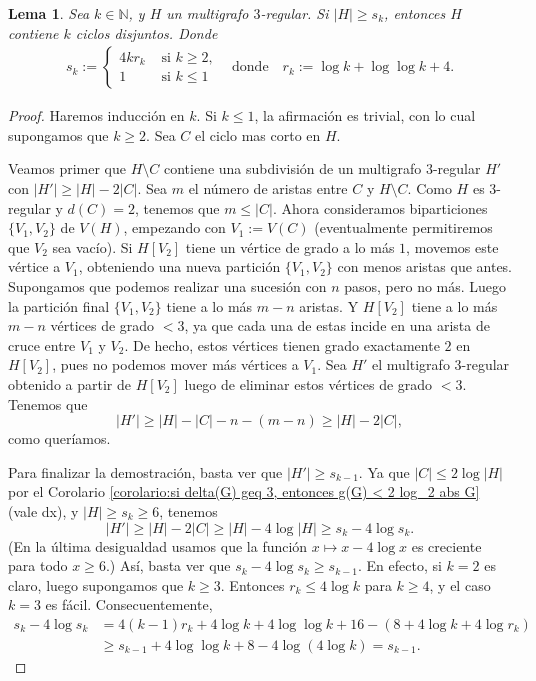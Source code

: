 \documentclass[12pt]{report}
\theoremstyle{plain}
\newtheorem{lemma}[theorem]{Lema}
\theoremstyle{definition}
\newcommand{\naturals}{\mathbb{N}}
\newcommand{\abs}[1]{\left \vert #1 \right \vert}
\begin{document}
\begin{lemma}
Sea $k \in \naturals$, y $H$ un multigrafo $3$-regular. Si $\abs H \geq s_k$, entonces $H$ contiene $k$ ciclos disjuntos. Donde
\begin{align*}
s_k := \begin{cases}
4kr_k & \text{ si $k \geq 2$,}\\
1 & \text{ si $k \leq 1$}
\end{cases} \quad \text{donde} \quad r_k := \log k + \log \log k + 4.
\end{align*}
\end{lemma}
\begin{proof}
Haremos inducción en $k$. Si $k \leq 1$, la afirmación es trivial, con lo cual supongamos que $k \geq 2$. Sea $C$ el ciclo mas corto en $H$.

Veamos primer que $H \setminus C$ contiene una subdivisión de un multigrafo $3$-regular $H'$ con $\abs{H'}\geq \abs H  - 2 \abs C$. Sea $m$ el número de aristas entre $C$ y $H \setminus C$. Como $H$ es $3$-regular y $d (C) = 2$, tenemos que $m \leq \abs C$. Ahora consideramos biparticiones $\{V_1, V_2\}$ de $V(H)$, empezando con $V_1 := V(C)$ (eventualmente permitiremos que $V_2$ sea vacío). Si $H[V_2]$ tiene un vértice de grado a lo más $1$, movemos este vértice a $V_1$, obteniendo una nueva partición $\{V_1,V_2\}$ con menos aristas que antes. Supongamos que podemos realizar una sucesión con $n$ pasos, pero no más. Luego la partición final $\{V_1,V_2\}$ tiene a lo más $m - n$ aristas. Y $H[V_2]$ tiene a lo más $m-n$ vértices de grado $< 3$, ya que cada una de estas incide en una arista de cruce entre $V_1$ y $V_2$. De hecho, estos vértices tienen grado exactamente $2$ en $H[V_2]$, pues no podemos mover más vértices a $V_1$. Sea $H'$ el multigrafo $3$-regular obtenido a partir de $H[V_2]$ luego de eliminar estos vértices de grado $<3$. Tenemos que
\[
    \abs{H'} \geq \abs H - \abs C - n - (m-n) \geq \abs H - 2 \abs C,
\]
como queríamos.

Para finalizar la demostración, basta ver que $\abs {H'} \geq s_{k-1}$. Ya que $\abs C \leq 2 \log \abs H$ por el Corolario \ref{corolario:si delta(G) geq 3, entonces g(G) < 2 log_2 abs G} (vale dx), y $\abs H \geq s_k \geq 6$, tenemos
\[
    \abs{H'} \geq \abs H - 2 \abs C \geq \abs H - 4 \log \abs H \geq s_k - 4 \log s_k.
\]
(En la última desigualdad usamos que la función $x \mapsto x - 4 \log x $ es creciente para todo $x \geq 6$.) Así, basta ver que $s_k - 4 \log s_k \geq s_{k-1}$. En efecto, si $k = 2$ es claro, luego supongamos que $k \geq 3$. Entonces $r_k \leq 4 \log k$ para $k \geq 4$, y el caso $k = 3$ es fácil. Consecuentemente,
\begin{align*}
s_k - 4 \log s_k &= 4(k-1) r_k + 4 \log k + 4 \log \log k + 16 - (8+ 4 \log k + 4 \log r_k) \\
&\geq s_{k-1} + 4 \log \log k + 8 - 4 \log (4 \log k) = s_{k-1}.
\end{align*}
\end{proof}
\end{document}
